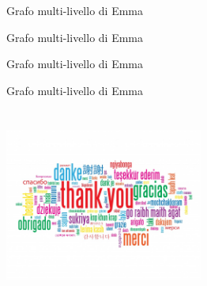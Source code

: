 \documentclass[xcolor=x11names,compress]{beamer}
\begin{document}
\begin{frame}[t]{Grafo multi-livello di Emma}
    
\end{frame}

\begin{frame}[t]{Grafo multi-livello di Emma}
    
\end{frame}

\begin{frame}[t]{Grafo multi-livello di Emma}
    
\end{frame}

\begin{frame}[t]{Grafo multi-livello di Emma}
    
\end{frame}


\section*{}
\appendix
\begin{frame}{}
\begin{center}
\includegraphics[width=6.5cm]{./immagini/thanks}
\end{center}
\end{frame}
\end{document}
